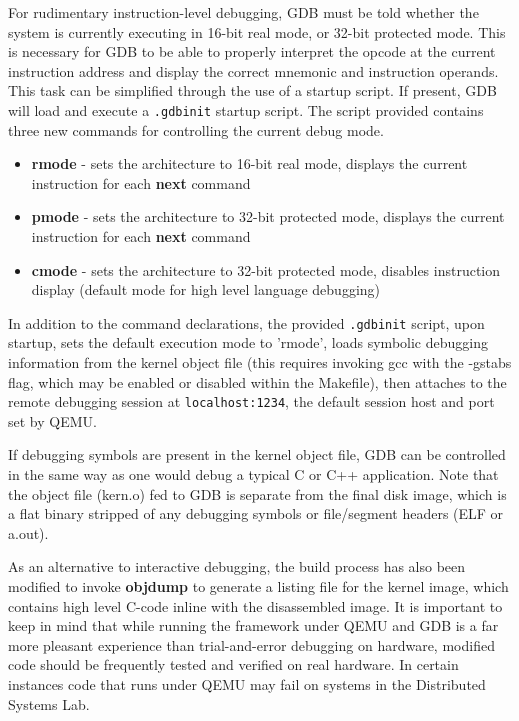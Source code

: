 \documentclass[titlepage]{article}
\begin{document}
For rudimentary instruction-level debugging, GDB must be told whether the system
is currently executing in 16-bit real mode, or 32-bit protected mode. This is
necessary for GDB to be able to properly interpret the opcode at the current
instruction address and display the correct mnemonic and instruction operands.
This task can be simplified through the use of a startup script. If present, GDB
will load and execute a \verb!.gdbinit! startup script. The script provided
contains three new commands for controlling the current
debug mode.

\begin{itemize}
\item \textbf{rmode} - sets the architecture to 16-bit real mode, displays
    the current instruction for each \textbf{next} command
\item \textbf{pmode} - sets the architecture to 32-bit protected mode, displays
    the current instruction for each \textbf{next} command
\item \textbf{cmode} - sets the architecture to 32-bit protected mode, disables
    instruction display (default mode for high level language debugging)
\end{itemize}

In addition to the command declarations, the provided \verb!.gdbinit! script,
upon startup, sets the default execution mode to 'rmode', loads symbolic
debugging information from the kernel object file (this requires invoking gcc
with the -gstabs flag, which may be enabled or disabled within the Makefile),
then attaches to the remote debugging session at \verb!localhost:1234!, the
default session host and port set by QEMU.

If debugging symbols are present in the kernel object file, GDB can be
controlled in the same way as one would debug a typical C or C++ application.
Note that the object file (kern.o) fed to GDB is separate from the final disk
image, which is a flat binary stripped of any debugging symbols or file/segment
headers (ELF or a.out).

As an alternative to interactive debugging, the build process has also been
modified to invoke \textbf{objdump} to generate a listing file for the kernel
image, which contains high level C-code inline with the disassembled image. It
is important to keep in mind that while running the framework under QEMU and GDB
is a far more pleasant experience than trial-and-error debugging on hardware,
modified code should be frequently tested and verified on real hardware. In
certain instances code that runs under QEMU may fail on systems in the
Distributed Systems Lab.
\end{document}
